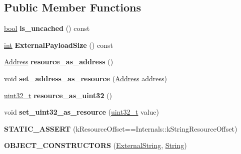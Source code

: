 \subsection*{Public Member Functions}
\begin{DoxyCompactItemize}
\item 
\mbox{\label{classv8_1_1internal_1_1ExternalString_a9c673697fe28d3ad6586136bd764ddd0}} 
\mbox{\hyperlink{classbool}{bool}} {\bfseries is\+\_\+uncached} () const
\item 
\mbox{\label{classv8_1_1internal_1_1ExternalString_a50383ab69115cd668af8e3bcb305bdcf}} 
\mbox{\hyperlink{classint}{int}} {\bfseries External\+Payload\+Size} () const
\item 
\mbox{\label{classv8_1_1internal_1_1ExternalString_a0a8aca29226b5871124a8498df530f0f}} 
\mbox{\hyperlink{classuintptr__t}{Address}} {\bfseries resource\+\_\+as\+\_\+address} ()
\item 
\mbox{\label{classv8_1_1internal_1_1ExternalString_a56af99239cba4631e630c1bba73dc28c}} 
void {\bfseries set\+\_\+address\+\_\+as\+\_\+resource} (\mbox{\hyperlink{classuintptr__t}{Address}} address)
\item 
\mbox{\label{classv8_1_1internal_1_1ExternalString_a8bd23feb0c66853f2b75f55ff8d29678}} 
\mbox{\hyperlink{classuint32__t}{uint32\+\_\+t}} {\bfseries resource\+\_\+as\+\_\+uint32} ()
\item 
\mbox{\label{classv8_1_1internal_1_1ExternalString_a97b5c523bfa3fa6af2da265ac16c9df5}} 
void {\bfseries set\+\_\+uint32\+\_\+as\+\_\+resource} (\mbox{\hyperlink{classuint32__t}{uint32\+\_\+t}} value)
\item 
\mbox{\label{classv8_1_1internal_1_1ExternalString_aedeea945a222ae1a66308dbfecb8d970}} 
{\bfseries S\+T\+A\+T\+I\+C\+\_\+\+A\+S\+S\+E\+RT} (k\+Resource\+Offset==Internals\+::k\+String\+Resource\+Offset)
\item 
\mbox{\label{classv8_1_1internal_1_1ExternalString_a434e94ba9cefa4220ef1286ea04974bd}} 
{\bfseries O\+B\+J\+E\+C\+T\+\_\+\+C\+O\+N\+S\+T\+R\+U\+C\+T\+O\+RS} (\mbox{\hyperlink{classv8_1_1internal_1_1ExternalString}{External\+String}}, \mbox{\hyperlink{classv8_1_1internal_1_1String}{String}})
\end{DoxyCompactItemize}
